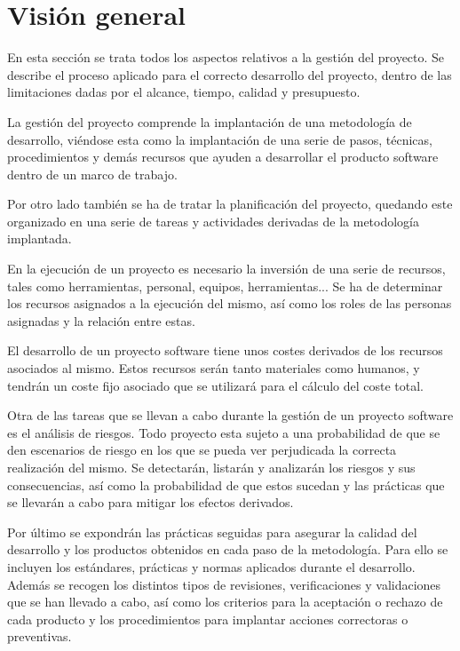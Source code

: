 \section {Visión general}
En esta sección se trata todos los aspectos relativos a la gestión del proyecto. Se describe el
proceso aplicado para el correcto desarrollo del proyecto, dentro de las limitaciones dadas por 
el alcance, tiempo, calidad y presupuesto.

La gestión del proyecto comprende la implantación de una metodología de desarrollo, viéndose 
esta como la implantación de una serie de pasos, técnicas, procedimientos y demás recursos que
ayuden a desarrollar el producto software dentro de un marco de trabajo. 

Por otro lado también se ha de tratar la planificación del proyecto, quedando este organizado en una 
serie de tareas y actividades derivadas de la metodología implantada. 

En la ejecución de un proyecto es necesario la inversión de una serie de recursos, tales como herramientas, 
personal, equipos, herramientas... Se ha de determinar los recursos asignados a la ejecución del mismo, así como los roles 
de las personas asignadas y la relación entre estas.

El desarrollo de un proyecto software tiene unos costes derivados de los recursos asociados al mismo. Estos recursos
serán tanto materiales como humanos, y tendrán un coste fijo asociado que se utilizará para el cálculo del coste total.

Otra de las tareas que se llevan a cabo durante la gestión de un proyecto software es el análisis de riesgos. Todo proyecto 
esta sujeto a una probabilidad de que se den escenarios de riesgo en los que se pueda ver perjudicada la correcta realización del mismo. 
Se detectarán, listarán y analizarán los riesgos y sus consecuencias, así como la probabilidad de que estos sucedan y las prácticas que se llevarán 
a cabo para mitigar los efectos derivados.

Por último se expondrán las prácticas seguidas para asegurar la calidad del desarrollo y los productos obtenidos en cada paso de la
metodología. Para ello se incluyen los estándares, prácticas y normas aplicados durante el desarrollo. Además 
se recogen los distintos tipos de revisiones, verificaciones y validaciones que se han llevado a cabo, así como los criterios 
para la aceptación o rechazo de cada producto y los procedimientos para implantar acciones correctoras o preventivas.

